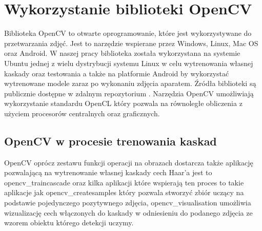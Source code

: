 \documentclass{article}
\let\stdsection\section
\renewcommand\section{\newpage\stdsection}
\numberwithin{equation}{section}
\begin{document}
\section{Wykorzystanie biblioteki OpenCV}\label{sec:opencv}
Biblioteka OpenCV to otwarte oprogramowanie, które jest wykorzystywane do przetwarzania zdjęć. Jest to narzędzie wspierane przez Windows, Linux, Mac OS oraz Android. W naszej pracy biblioteka została wykorzystana na systemie Ubuntu jednej z wielu dystrybucji systemu Linux w celu wytrenowania własnej kaskady oraz testowania a także na platformie Android by wykorzystać wytrenowane modele zaraz po wykonaniu zdjęcia aparatem. Źródła biblioteki są publicznie dostępne w zdalnym repozytorium \cite{OpenCVSource}. Narzędzia OpenCV umożliwiają wykorzystanie standardu OpenCL który pozwala na równoległe obliczenia z użyciem procesorów centralnych oraz graficznych.


\subsection{OpenCV w procesie trenowania kaskad}

OpenCV oprócz zestawu funkcji operacji na obrazach dostarcza także aplikację pozwalającą na wytrenowanie własnej kaskady cech Haar’a jest to opencv\_traincascade oraz kilka aplikacji które wspierają ten proces to takie aplikacje jak opencv\_createsamples który pozwala stworzyć zbiór uczący na podstawie pojedynczego pozytywnego zdjęcia, opencv\_visualisation umożliwia wizualizację cech włączonych do kaskady w odniesieniu do podanego zdjęcia ze wzorem obiektu którego detekcji uczymy.
\end{document}
